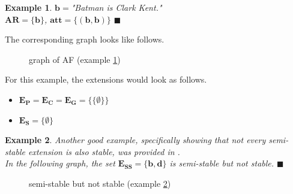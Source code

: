 \documentclass[12pt]{report}
\numberwithin{figure}{chapter}
\theoremstyle{break}
\newtheorem{exmpl}{Example}[chapter]
\newenvironment{myexmpl}{\begin{exmpl}}{$\blacksquare$ \end{exmpl}}
\begin{document}
\begin{myexmpl}
$\bm{b=}$"Batman is Clark Kent."\\
$\bm{AR=\{b\}}$, $\bm{att=\{(b,b)\}}$
\label{b loop ex}
\end{myexmpl}

The corresponding graph looks like follows.
\begin{figure}[h!]
\begin{center}\end{center}
\caption{graph of AF (example \ref{b loop ex})}
\end{figure}

For this example, the extensions would look as follows.
\begin{itemize}
	\item{$\bm{E_{P}=E_{C}=E_{G}=\{\{\emptyset\}\}}$}
	\item{$\bm{E_{S}=\{\emptyset\}}$}
\end{itemize}

\begin{myexmpl}
Another good example, specifically showing that not every semi-stable extension is also stable, was provided in \cite{Caminada}.\\
In the following graph, the set $\bm{E_{SS}=\{b,d\}}$ is semi-stable but not stable.
\label{stable != semi-stable}
\end{myexmpl}
\begin{figure}[h!]
\begin{center}\end{center}
\caption{semi-stable but not stable (example \ref{stable != semi-stable})}
\end{figure}

\newpage
\end{document}
